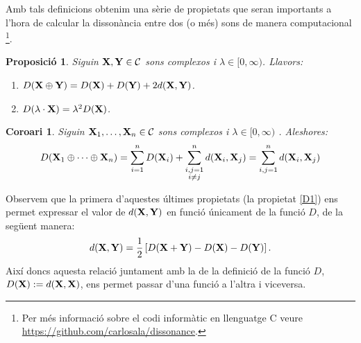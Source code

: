 \documentclass{article}
\theoremstyle{math}
\newtheorem{prop}[definition]{Proposició}
\newtheorem{corollary}[definition]{Coro\lgem ari}
\theoremstyle{TheoremNum}
\newcommand{\0}{\ensuremath{\vb{0}}}
\newcommand{\X}{\ensuremath{\vb{X}}}
\newcommand{\Y}{\ensuremath{\vb{Y}}}
\begin{document}
\noindent Amb tals definicions obtenim una sèrie de propietats que seran importants a l'hora de calcular la dissonància entre dos (o més) sons de manera computacional \footnote{Per més informació sobre el codi informàtic en llenguatge C veure \url{https://github.com/carlosala/dissonance}.}.
\begin{prop}\label{prop_dem2}
    Siguin $\X,\Y\in\mathcal{C}$ sons complexos i $\lambda\in[0,\infty)$. Llavors:
    \begin{enumerate}[label=$D$\arabic*),ref=$D$\arabic*]
        \item\label{D1} $D(\X\oplus\Y)=D(\X)+D(\Y)+2d(\X,\Y)$.
        \item\label{D2} $D(\lambda\cdot \X)=\lambda^2D(\X)$.
    \end{enumerate}
\end{prop}
\begin{corollary}\label{coro_dem3}
    Siguin $\X_1,\ldots,\X_n\in\mathcal{C}$ sons complexos i $\lambda\in[0,\infty)$ . Aleshores: 
    \begin{equation}\label{eq_final}
        D(\X_1\oplus\cdots\oplus\X_n)=\sum_{i=1}^nD(\X_i)+\sum_{\substack{i,j=1\\i\ne j}}^nd(\X_i,\X_j)=\sum_{i,j=1}^nd(\X_i,\X_j)
    \end{equation}
\end{corollary}
\noindent Observem que la primera d'aquestes últimes propietats (la propietat \ref{D1}) ens permet expressar el valor de $d(\X,\Y)$ en funció únicament de la funció $D$, de la següent manera: $$d(\X,\Y)=\frac{1}{2}\left[D(\X+\Y)-D(\X)-D(\Y)\right].$$
Així doncs aquesta relació juntament amb la de la definició de la funció $D$, $D(\X):=d(\X,\X)$, ens permet passar d'una funció a l'altra i viceversa.\par 
\end{document}
